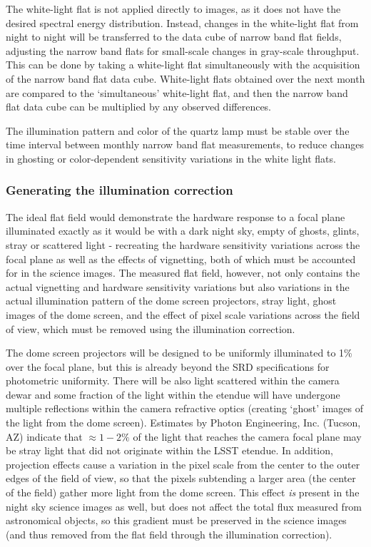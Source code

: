 \documentclass[12pt,preprint]{aastex}
\begin{document}
The white-light flat is not applied directly to images, as it
does not have the desired spectral energy distribution. Instead,
changes in the white-light flat from night to night will be
transferred to the data cube of narrow band flat fields, adjusting the
narrow band flats for small-scale changes in gray-scale
throughput. This can be done by taking a white-light flat
simultaneously with the acquisition of the narrow band flat data
cube. White-light flats obtained over the next month are compared to
the `simultaneous' white-light flat, and then the narrow band flat
data cube can be multiplied by any observed differences.

The illumination pattern and color of the quartz lamp must be stable
over the time interval between monthly narrow band flat measurements,
to reduce changes in ghosting or color-dependent sensitivity
variations in the white light flats.

\subsubsection{Generating the illumination correction}
\label{sec:ic}

The ideal flat field would demonstrate the hardware response to a
focal plane illuminated exactly as it would be with a dark night sky,
empty of ghosts, glints, stray or scattered light - recreating the
hardware sensitivity variations across the focal plane as well as the
effects of vignetting, both of which must be accounted for in the
science images. The measured flat field, however, not only contains
the actual vignetting and hardware sensitivity variations but also
variations in the actual illumination pattern of the dome screen
projectors, stray light, ghost images of the dome screen, and the
effect of pixel scale variations across the field of view, which must
be removed using the illumination correction. 

The dome screen projectors will be designed to be uniformly
illuminated to 1\% over the focal plane, but this is already beyond
the SRD specifications for photometric uniformity.  There will be also
light scattered within the camera dewar and some fraction of the light
within the etendue will have undergone multiple reflections within the
camera refractive optics (creating `ghost' images of the light from
the dome screen). Estimates by Photon Engineering, Inc. (Tucson, AZ)
indicate that $\approx1-2\%$ of the light that reaches the camera
focal plane may be stray light that did not originate within the LSST
etendue. In addition, projection effects cause a variation in the
pixel scale from the center to the outer edges of the field of view,
so that the pixels subtending a larger area (the center of the field)
gather more light from the dome screen. This effect {\it is} present
in the night sky science images as well, but does not affect the total
flux measured from astronomical objects, so this gradient must be
preserved in the science images (and thus removed from the flat field
through the illumination correction). 
\end{document}
